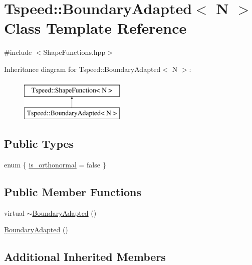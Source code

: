 \hypertarget{classTspeed_1_1BoundaryAdapted}{\section{Tspeed\-:\-:Boundary\-Adapted$<$ N $>$ Class Template Reference}
\label{classTspeed_1_1BoundaryAdapted}
}


{\ttfamily \#include $<$Shape\-Functions.\-hpp$>$}

Inheritance diagram for Tspeed\-:\-:Boundary\-Adapted$<$ N $>$\-:\begin{figure}[H]
\begin{center}
\leavevmode
\includegraphics[height=2.000000cm]{classTspeed_1_1BoundaryAdapted}
\end{center}
\end{figure}
\subsection*{Public Types}
\begin{DoxyCompactItemize}
\item 
enum \{ \hyperlink{classTspeed_1_1BoundaryAdapted_a43bbb02cefcd3061b7b85ee061d0fe21a14fd943d0e78f08196b5f0f9e05232ce}{is\-\_\-orthonormal} = false
 \}
\end{DoxyCompactItemize}
\subsection*{Public Member Functions}
\begin{DoxyCompactItemize}
\item 
virtual \hyperlink{classTspeed_1_1BoundaryAdapted_a0a85bcdf3da9c2a7db73f485fb83aa3f}{$\sim$\-Boundary\-Adapted} ()
\item 
\hyperlink{classTspeed_1_1BoundaryAdapted_a9e2a2066ba91ed177411d9ab0290e706}{Boundary\-Adapted} ()
\end{DoxyCompactItemize}
\subsection*{Additional Inherited Members}


